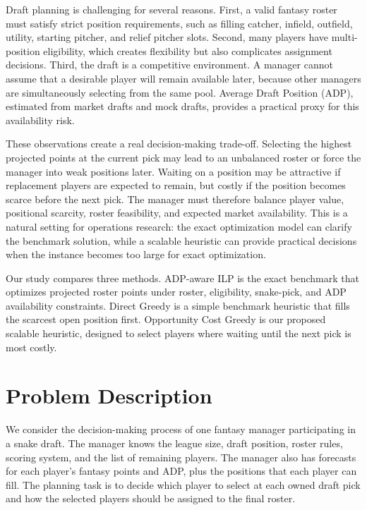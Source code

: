 \documentclass[12pt]{article}
\begin{document}
Draft planning is challenging for several reasons. First, a valid fantasy roster must satisfy strict position requirements, such as filling catcher, infield, outfield, utility, starting pitcher, and relief pitcher slots. Second, many players have multi-position eligibility, which creates flexibility but also complicates assignment decisions. Third, the draft is a competitive environment. A manager cannot assume that a desirable player will remain available later, because other managers are simultaneously selecting from the same pool. Average Draft Position (ADP), estimated from market drafts and mock drafts, provides a practical proxy for this availability risk.

These observations create a real decision-making trade-off. Selecting the highest projected points at the current pick may lead to an unbalanced roster or force the manager into weak positions later. Waiting on a position may be attractive if replacement players are expected to remain, but costly if the position becomes scarce before the next pick. The manager must therefore balance player value, positional scarcity, roster feasibility, and expected market availability. This is a natural setting for operations research: the exact optimization model can clarify the benchmark solution, while a scalable heuristic can provide practical decisions when the instance becomes too large for exact optimization.

Our study compares three methods. ADP-aware ILP is the exact benchmark that optimizes projected roster points under roster, eligibility, snake-pick, and ADP availability constraints. Direct Greedy is a simple benchmark heuristic that fills the scarcest open position first. Opportunity Cost Greedy is our proposed scalable heuristic, designed to select players where waiting until the next pick is most costly.

\section{Problem Description}
We consider the decision-making process of one fantasy manager participating in a snake draft. The manager knows the league size, draft position, roster rules, scoring system, and the list of remaining players. The manager also has forecasts for each player's fantasy points and ADP, plus the positions that each player can fill. The planning task is to decide which player to select at each owned draft pick and how the selected players should be assigned to the final roster.
\end{document}
